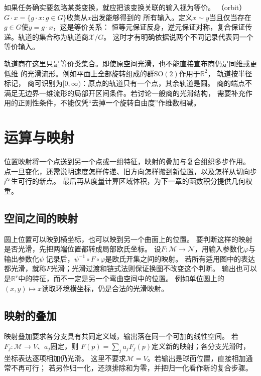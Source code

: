 如果任务确实要忽略某类变换，就应把该变换关联的输入视为等价。
（orbit）$G\cdot x=\{g\cdot x:g\in G\}$收集从$x$出发能够得到的
所有输入。定义$x\sim y$当且仅当存在$g\in G$使$y=g\cdot x$，这是等价关系：
恒等元保证反身，逆元保证对称，复合保证传递。轨道的集合称为轨道商$\mathcal X/G$。
这时才有明确依据说两个不同记录代表同一个等价输入。


轨道商在这里只是等价类集合。即使原空间光滑，也不能直接宣布商仍是同维或更低维
的光滑流形。例如平面上全部旋转组成的群$\mathrm{SO}(2)$作用于$\mathbb R^2$，
轨道按半径标记，
商可识别为$[0,\infty)$：原点的轨道只有一个点，其余轨道是圆。
商的端点不满足无边界一维流形的局部开区间条件。若讨论一般商的光滑结构，
需要补充作用的正则性条件，不能仅凭“去掉一个旋转自由度”作维数相减。

\section{运算与映射}
\label{sec:geometry-operations}

位置映射将一个点送到另一个点或一组特征，映射的叠加与复合组织多步作用。
点一旦变化，还需说明速度怎样传递、旧方向怎样搬到新位置，以及怎样从切向步产生可行的新点。
最后再从度量计算区域体积，为下一章的函数积分提供几何权重。

\subsection{空间之间的映射}
\label{sec:geometry-point-maps}

圆上位置可以映到横坐标，也可以映到另一个曲面上的位置。
要判断这样的映射是否光滑，先把两端位置都转成局部欧氏坐标。
设$F:\mathcal M\to\mathcal N$，用输入参数化$\varphi$与输出参数化$\psi$
记录后，$\psi^{-1}\circ F\circ\varphi$是欧氏开集之间的映射。
若所有适用图中的表达都光滑，就称$F$光滑；光滑过渡和链式法则保证换图不改变这个判断。
输出也可以是$\mathbb R^r$中的特征，而不一定是另一个弯曲空间中的位置。
例如单位圆上的$(x,y)\mapsto x$读取环境横坐标，仍是合法的光滑映射。

\subsection{映射的叠加}
\label{sec:geometry-map-addition}

映射叠加要求各分支具有共同定义域，输出落在同一个可加的线性空间。
若$F_j:\mathcal M\to V$、$a_j$固定，则
$F(p)=\sum_j a_jF_j(p)$定义新的映射；各分支光滑时，坐标表达逐项相加仍光滑。
这里不要求$\mathcal M=V$。若输出是球面位置，直接相加通常不再可行；
若另作归一化，还须排除和为零，并把归一化看作新的复合步骤。

